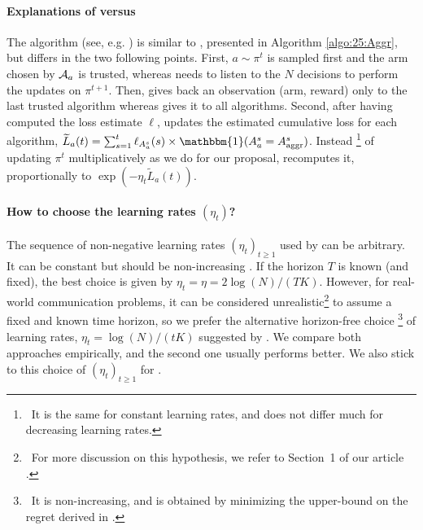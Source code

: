 \paragraph{Explanations of \Aggr{} versus \ExpQ{} }\label{sub:25:Exp4}

The \ExpQ{} algorithm (see, e.g. \cite[Section 4.2]{Bubeck12})
is similar to \Aggr{}, presented in Algorithm \ref{algo:25:Aggr},
but differs in the two following points.
%
First, $a\sim\pi^t$ is sampled first and the arm chosen by $\mathcal{A}_a$ is trusted, whereas \Aggr{}
needs to listen to the $N$ decisions to perform the updates on $\pi^{t+1}$.
Then, \ExpQ{} gives back an observation (arm, reward) only to the last trusted algorithm
whereas \Aggr{} gives it to all algorithms.
%
Second, after having computed the loss estimate $\ell$, \ExpQ{} updates the estimated cumulative loss for each algorithm,
$\widetilde{L}_a(t) = \sum_{s=1}^{t} \ell_{A_a^s}(s) \times \mathbbm{1}(A^{s}_{a} = A^{s}_{\mathrm{aggr}})$.
%
Instead
\footnote{~It is the same for constant learning rates, and does not differ much for decreasing learning rates.}
of updating $\pi^{t}$ multiplicatively as we do for our proposal, \ExpQ{} recomputes it, proportionally to
$\exp(- \eta_t \widetilde{L}_a(t))$.


\paragraph{How to choose the learning rates $(\eta_t)$?}
%
The sequence of non-negative learning rates $(\eta_t)_{t \geq 1}$ used by \ExpQ{} can be arbitrary.
It can be constant but should be non-increasing \cite[Theorem 4.2]{Bubeck12}.
If the horizon $T$ is known (and fixed), the best choice is given by $\eta_t = \eta = 2 \log(N) / (T K)$.
However, for real-world communication problems, it can be considered unrealistic\footnote{~For more discussion on this hypothesis, we refer to Section~1 of our article \cite{Besson2018DoublingTricks}.} to assume a fixed and known time horizon, so we prefer the alternative horizon-free choice%
\footnote{~It is non-increasing, and is obtained by minimizing the upper-bound on the regret derived in \cite[pp48]{Bubeck12}.}
of learning rates,
$\eta_t = \log(N) / (t K)$ suggested by \cite{Bubeck12}.
We compare both approaches empirically, and the second one usually performs better.
We also stick to this choice of $(\eta_t)_{t \geq 1}$ for \Aggr.



